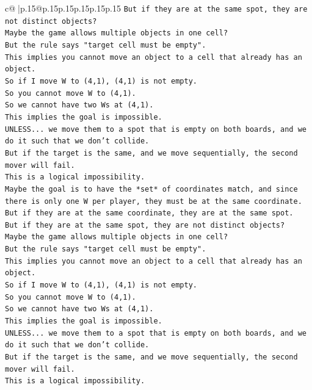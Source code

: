 \documentclass{article}
\begin{document}
{\begin{supertabular}{c@{$\;$}|p{.15\linewidth}@{}p{.15\linewidth}p{.15\linewidth}p{.15\linewidth}p{.15\linewidth}p{.15\linewidth}}
{{{\texttt{But if they are at the same spot, they are not distinct objects?} \\
\texttt{Maybe the game allows multiple objects in one cell?} \\
\texttt{But the rule says "target cell must be empty".} \\
\texttt{This implies you cannot move an object to a cell that already has an object.} \\
\texttt{So if I move W to (4,1), (4,1) is not empty.} \\
\texttt{So you cannot move W to (4,1).} \\
\texttt{So we cannot have two Ws at (4,1).} \\
\texttt{This implies the goal is impossible.} \\
\texttt{UNLESS... we move them to a spot that is empty on both boards, and we do it such that we don't collide.} \\
\texttt{But if the target is the same, and we move sequentially, the second mover will fail.} \\
\texttt{This is a logical impossibility.} \\
\texttt{Maybe the goal is to have the *set* of coordinates match, and since there is only one W per player, they must be at the same coordinate.} \\
\texttt{But if they are at the same coordinate, they are at the same spot.} \\
\texttt{But if they are at the same spot, they are not distinct objects?} \\
\texttt{Maybe the game allows multiple objects in one cell?} \\
\texttt{But the rule says "target cell must be empty".} \\
\texttt{This implies you cannot move an object to a cell that already has an object.} \\
\texttt{So if I move W to (4,1), (4,1) is not empty.} \\
\texttt{So you cannot move W to (4,1).} \\
\texttt{So we cannot have two Ws at (4,1).} \\
\texttt{This implies the goal is impossible.} \\
\texttt{UNLESS... we move them to a spot that is empty on both boards, and we do it such that we don't collide.} \\
\texttt{But if the target is the same, and we move sequentially, the second mover will fail.} \\
\texttt{This is a logical impossibility.} \\
}}}
\end{supertabular}}
\end{document}
